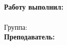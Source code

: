 \begin{titlepage}	%

	\begin{center}		%

		\large \university \\
		\large \faculty \\
		\large \department \\[6cm]
		
		\huge \subject \\[0.5cm] %
		\large \docname \\[5.1cm]

	\end{center}


	\begin{flushright} %
		\begin{minipage}{0.25\textwidth} %
			\begin{flushleft} %

				\large\textbf{Работу выполнил:}\\
				\large \studentname \\
				\large {Группа:} \group \\
				
				\large \textbf{Преподаватель:}\\
				\large \tutorname

			\end{flushleft}
		\end{minipage}
	\end{flushright}
	
	\vfill %

	\begin{center}
	\large \city \\
	\large \the\year %
	\end{center} %

\end{titlepage} %

\vfill %
